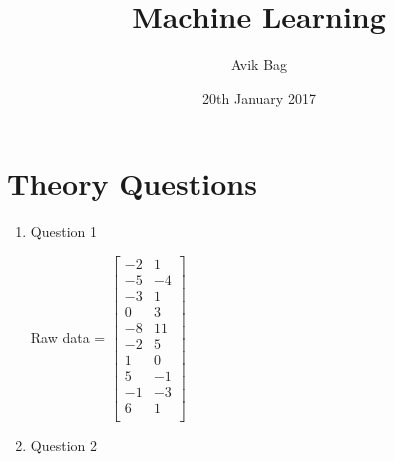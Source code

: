 \documentclass{article}
\title{Machine Learning}
\author{Avik Bag}
\date{20th January 2017}
\begin{document}
\maketitle

\section{Theory Questions}
\begin{enumerate}
  
  \item Question 1 \\
    \begin{center}
      Raw data = 
      $
      \begin{bmatrix}
        -2 & 1 \\
        -5 & -4 \\
        -3 & 1 \\
        0  & 3 \\
        -8 & 11 \\
        -2 & 5 \\
        1  & 0 \\
        5  & -1 \\
        -1 & -3 \\
        6  & 1 \\
      \end{bmatrix}
      $
    \end{center}

  \item Question 2

\end{enumerate}
\end{document}
